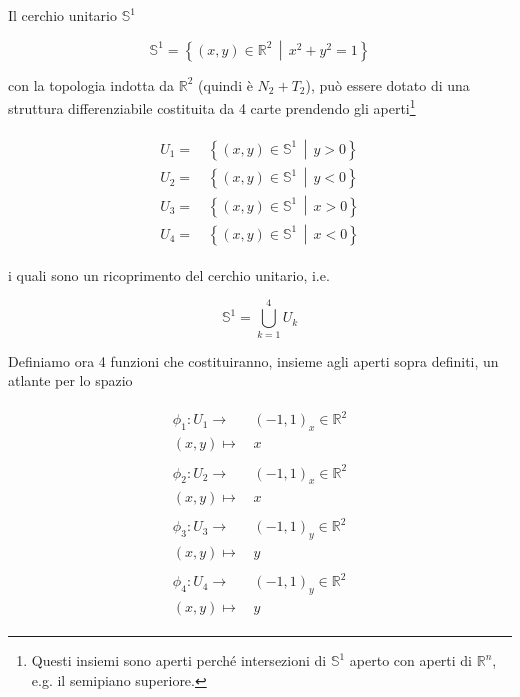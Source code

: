 Il cerchio unitario $ \mathbb{S}^{1} $

\begin{equation}
	\mathbb{S}^{1} = \left\{ (x,y) \in \mathbb{R}^{2} \, \middle| \, x^{2} + y^{2} = 1 \right\}
\end{equation}

con la topologia indotta da $ \mathbb{R}^{2} $ (quindi è $ N_{2}+T_{2} $), può essere dotato di una struttura differenziabile costituita da 4 carte prendendo gli aperti\footnote{%
	Questi insiemi sono aperti perché intersezioni di $ \mathbb{S}^{1} $ aperto con aperti di $ \mathbb{R}^{n} $, e.g. il semipiano superiore.}

\begin{align}
	\begin{split}
		U_{1} =& \, \left\{ (x,y) \in \mathbb{S}^{1} \, \middle| \, y>0 \right\}\\
		U_{2} =& \, \left\{ (x,y) \in \mathbb{S}^{1} \, \middle| \, y<0 \right\}\\
		U_{3} =& \, \left\{ (x,y) \in \mathbb{S}^{1} \, \middle| \, x>0 \right\}\\
		U_{4} =& \, \left\{ (x,y) \in \mathbb{S}^{1} \, \middle| \, x<0 \right\}
	\end{split}	
\end{align}

i quali sono un ricoprimento del cerchio unitario, i.e.

\begin{equation}
	\mathbb{S}^{1} = \bigcup_{k=1}^{4} U_{k}
\end{equation}

Definiamo ora 4 funzioni che costituiranno, insieme agli aperti sopra definiti, un atlante per lo spazio

\begin{align}
	\begin{split}
		\phi_{1} : U_{1} \to& \, (-1,1)_{x} \in \mathbb{R}^{2}\\
		(x,y) \mapsto& \, x\\\\
		\phi_{2} : U_{2} \to& \, (-1,1)_{x} \in \mathbb{R}^{2}\\
		(x,y) \mapsto& \, x\\\\
		\phi_{3} : U_{3} \to& \, (-1,1)_{y} \in \mathbb{R}^{2}\\
		(x,y) \mapsto& \, y\\\\
		\phi_{4} : U_{4} \to& \, (-1,1)_{y} \in \mathbb{R}^{2}\\
		(x,y) \mapsto& \, y
	\end{split}
\end{align}

